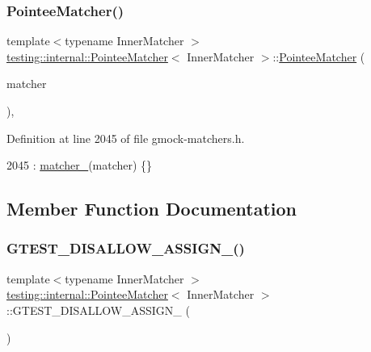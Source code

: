 \subsubsection{\texorpdfstring{Pointee\+Matcher()}{PointeeMatcher()}}
{\footnotesize\ttfamily template$<$typename Inner\+Matcher $>$ \\
\hyperlink{classtesting_1_1internal_1_1PointeeMatcher}{testing\+::internal\+::\+Pointee\+Matcher}$<$ Inner\+Matcher $>$\+::\hyperlink{classtesting_1_1internal_1_1PointeeMatcher}{Pointee\+Matcher} (\begin{DoxyParamCaption}\item[{const Inner\+Matcher \&}]{matcher }\end{DoxyParamCaption})\hspace{0.3cm}{\ttfamily [inline]}, {\ttfamily [explicit]}}



Definition at line 2045 of file gmock-\/matchers.\+h.


\begin{DoxyCode}
2045 : \hyperlink{classtesting_1_1internal_1_1PointeeMatcher_aa429edbc73c0350807d9b0ffcc6ab922}{matcher\_}(matcher) \{\}
\end{DoxyCode}


\subsection{Member Function Documentation}
\mbox{\label{classtesting_1_1internal_1_1PointeeMatcher_a9e564aa0569377a404edefb7b2ccdb16}} 
\subsubsection{\texorpdfstring{G\+T\+E\+S\+T\+\_\+\+D\+I\+S\+A\+L\+L\+O\+W\+\_\+\+A\+S\+S\+I\+G\+N\+\_\+()}{GTEST\_DISALLOW\_ASSIGN\_()}}
{\footnotesize\ttfamily template$<$typename Inner\+Matcher $>$ \\
\hyperlink{classtesting_1_1internal_1_1PointeeMatcher}{testing\+::internal\+::\+Pointee\+Matcher}$<$ Inner\+Matcher $>$\+::G\+T\+E\+S\+T\+\_\+\+D\+I\+S\+A\+L\+L\+O\+W\+\_\+\+A\+S\+S\+I\+G\+N\+\_\+ (\begin{DoxyParamCaption}\item[{\hyperlink{classtesting_1_1internal_1_1PointeeMatcher}{Pointee\+Matcher}$<$ Inner\+Matcher $>$}]{ }\end{DoxyParamCaption})\hspace{0.3cm}{\ttfamily [private]}}

